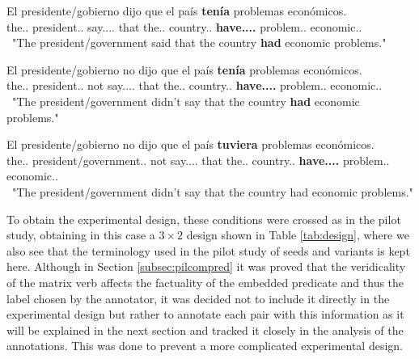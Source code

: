 \begin{exe}
  \ex
    \begin{xlist}
      \item  {\gll El presidente/gobierno dijo que el país \textbf{tenía} problemas económicos.\\ the.\M.\Sg{} president.\M.\Sg{} say.\Pst.\Pfv.\Ind.\Tsg{} that the.\M.\Sg{} country.\M.\Sg{} \textbf{have.\Pst.\Ipfv.\Ind.\Tsg{}} problem.\M.\Pl{} economic.\M.\Pl{} \\\ "The president/government said that the country \textbf{had} economic problems."\glt }\label{ex:stmoodaltbas}
      \item  {\gll El presidente/gobierno no dijo que el país \textbf{tenía} problemas económicos.\\ the.\M.\Sg{} president.\M.\Sg{} not say.\Pst.\Pfv.\Ind.\Tsg{} that the.\M.\Sg{} country.\M.\Sg{} \textbf{have.\Pst.\Ipfv.\Ind.\Tsg{}} problem.\M.\Pl{} economic.\M.\Pl{} \\\ "The president/government didn't say that the country \textbf{had} economic problems."\glt }\label{ex:stmoodaltind}
      \item {\gll El presidente/gobierno no dijo que el país \textbf{tuviera} problemas económicos.\\   the.\M.\Sg{} president/government.\M.\Sg{} not say.\Pst.\Pfv.\Ind.\Tsg{} that the.\M.\Sg{} country.\M.\Sg{} \textbf{have.\Pst.\Ipfv.\Sbjv.\Tsg{}} problem.\M.\Pl{} economic.\M.\Pl{} \\\ "The president/government didn't say that the country had economic problems."\glt }\label{ex:stmoodaltsbjv}
    \end{xlist}
\end{exe}

To obtain the experimental design, these conditions were crossed as in the pilot study, obtaining in this case a $3\times2$ design shown in Table \ref{tab:design}, where we also see that the terminology used in the pilot study of seeds and variants is kept here. Although in Section \ref{subsec:pilcompred} it was proved that the veridicality of the matrix verb affects the factuality of the embedded predicate and thus the label chosen by the annotator, it was decided not to include it directly in the experimental design but rather to annotate each pair with this information as it will be explained in the next section and tracked it closely in the analysis of the annotations. This was done to prevent a more complicated experimental design.\\

